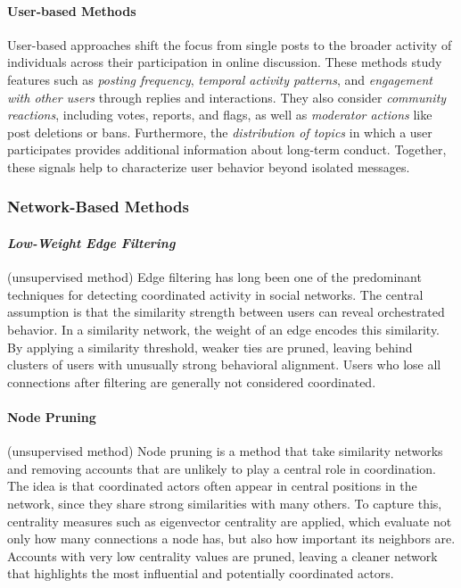 \documentclass{article}
\begin{document}
\paragraph{User-based Methods} User-based approaches shift the focus from single posts to the broader activity of individuals across their participation in online discussion. These methods study features such 
as \textit{posting frequency}, \textit{temporal activity patterns}, and \textit{engagement with other users} through replies and interactions. They also consider \textit{community reactions}, including votes, reports, and flags, as well as \textit{moderator actions} like post deletions or bans. Furthermore, the \textit{distribution of topics} in which a user participates provides additional information about long-term conduct. Together, these signals help to characterize user behavior beyond isolated messages. \cite{trolls2014decluttering}

\subsubsection{Network-Based Methods}
\paragraph {\textit{Low-Weight Edge Filtering}} (unsupervised method) Edge filtering has long been one of the predominant techniques for detecting coordinated activity in social networks. The central assumption is that the similarity strength between users can reveal orchestrated behavior. In a similarity network, the weight of an edge encodes this similarity. By applying a similarity threshold, weaker ties are pruned, leaving behind clusters of users with unusually strong behavioral alignment. Users who lose all connections after filtering are generally not considered coordinated. \cite{uncovering2021networks, luceri2024unmasking, SocioLinguistic2024coordinated}

\paragraph{Node Pruning} (unsupervised method) Node pruning is a method that take similarity networks and removing accounts that are unlikely to play a central role in coordination. The idea is that coordinated actors often appear in central positions in the network, since they share strong similarities with many others. To capture this, centrality measures such as eigenvector centrality are applied, which evaluate not only how many connections a node has, but also how important its neighbors are. Accounts with very low centrality values are pruned, leaving a cleaner network that highlights the most influential and potentially coordinated actors. \cite{luceri2024unmasking, minici2025iohunter, mannocci2024detection}
\end{document}
